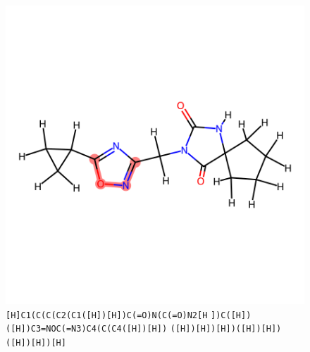\documentclass{article}
\begin{document}
\begin{figure}[ht]
\centering
    \includegraphics{mol12.png}
\cprotect\caption{\verb|[H]C1(C(C(C2(C1([H])[H])C(=O)N(C(=O)N2[H| \verb|])C([H])([H])C3=NOC(=N3)C4(C(C4([H])[H])| \verb|([H])[H])[H])([H])[H])([H])[H])[H]| }
\end{figure}
\end{document}
